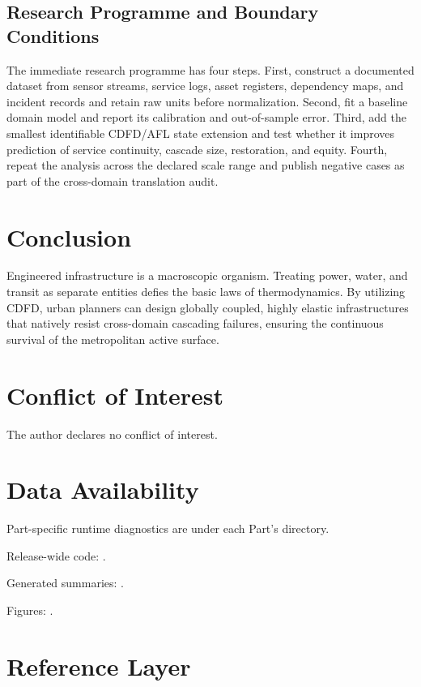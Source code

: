 \documentclass[11pt,a4paper]{article}
\begin{document}
\subsection{Research Programme and Boundary Conditions}

The immediate research programme has four steps. First, construct a documented
dataset from sensor streams, service logs, asset registers, dependency maps, and incident records and retain raw units before normalization.
Second, fit a baseline domain model and report its calibration and out-of-sample
error. Third, add the smallest identifiable CDFD/AFL state extension and test
whether it improves prediction of service continuity, cascade size, restoration, and equity. Fourth, repeat the
analysis across the declared scale range and publish negative cases as part of
the cross-domain translation audit.


\section{Conclusion}
Engineered infrastructure is a macroscopic organism. Treating power, water, and transit as separate entities defies the basic laws of thermodynamics. By utilizing CDFD, urban planners can design globally coupled, highly elastic infrastructures that natively resist cross-domain cascading failures, ensuring the continuous survival of the metropolitan active surface.
\section*{Conflict of Interest} The author declares no conflict of interest.
\section*{Data Availability}
Part-specific runtime diagnostics are under each Part's  directory.

Release-wide code: .

Generated summaries: .

Figures: .


\section{Reference Layer}


\end{document}

